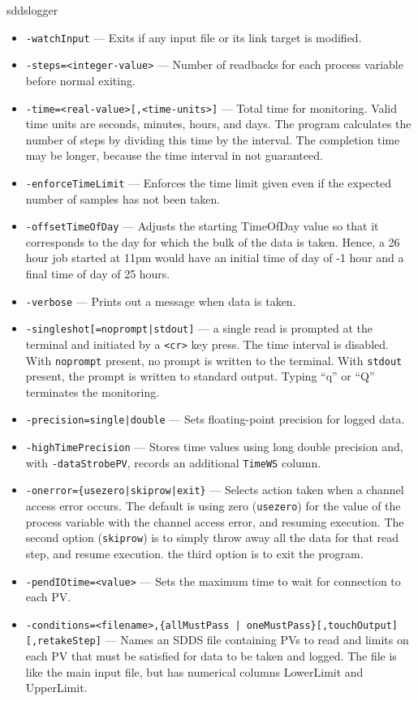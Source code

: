 \begin{sddsprog}{sddslogger}
\begin{itemize}
  \item {\tt -watchInput} --- Exits if any input file or its link target is modified.
  \item {\tt -steps=<integer-value>} --- Number of readbacks for each process variable before normal exiting.
  \item {\tt -time=<real-value>[,<time-units>]} --- Total time for monitoring. Valid time units are
      seconds, minutes, hours, and days. The program calculates the number of steps by dividing this time
      by the interval. The completion time may be longer, because the time interval in not guaranteed.
  \item {\tt -enforceTimeLimit} --- Enforces the time limit given even if the expected number of samples has
      not been taken.
  \item {\tt -offsetTimeOfDay} --- Adjusts the starting TimeOfDay value so that it corresponds to the
      day for which the bulk of the data is taken.  Hence, a 26 hour job started at 11pm would have an
      initial time of day of -1 hour and a final time of day of 25 hours.
  \item {\tt -verbose} --- Prints out a message when data is taken.
  \item {\verb+-singleshot[=noprompt|stdout]+} --- a single read is prompted at the terminal
      and initiated by a \verb+<cr>+ key press. The time interval is disabled.
      With \verb+noprompt+ present, no prompt is written to the terminal.
      With \verb+stdout+ present, the prompt is written to standard output.
      Typing ``q'' or ``Q'' terminates the monitoring.
  \item {\tt -precision={single|double}} --- Sets floating-point precision for logged data.
  \item {\tt -highTimePrecision} --- Stores time values using long double precision and,
      with \verb+-dataStrobePV+, records an additional \verb+TimeWS+ column.
  \item {\tt -onerror=\{usezero|skiprow|exit\}} --- Selects action taken when a channel access error occurs.
      The default is using zero ({\tt usezero}) for the value of the process variable
      with the channel access error, and resuming execution. The second option ({\tt skiprow}) is to
      simply throw away all the data for that read step, and resume execution.
      the third option is to exit the program.
  \item {\tt -pendIOtime=<value>} --- Sets the maximum time to wait for connection to each PV.
  \item {\verb+-conditions=<filename>,{allMustPass | oneMustPass}[,touchOutput][,retakeStep]+} ---
      Names an SDDS file containing PVs to read and limits on each PV that must
      be satisfied for data to be taken and logged.  The file is like the main
      input file, but has numerical columns LowerLimit and UpperLimit.


\end{itemize}
\end{sddsprog}
